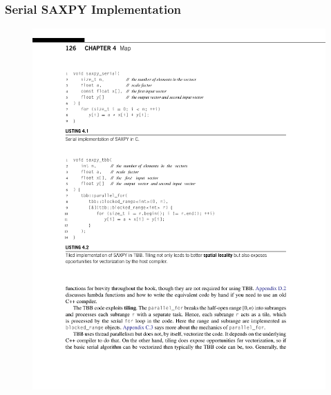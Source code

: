 \documentclass[xcolor=dvipsnames]{beamer}
\begin{document}
		\begin{frame} \frametitle{Serial SAXPY Implementation}
			\begin{figure}
				\centering
				\includegraphics[width=115mm]{images/listing-4-1.pdf}
			\end{figure}
		\end{frame}
		
\end{document}
